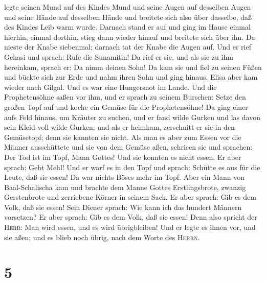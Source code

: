 legte seinen Mund auf des Kindes Mund und seine Augen auf desselben
Augen und seine Hände auf desselben Hände und breitete sich also über
dasselbe, daß des Kindes Leib warm wurde.  Darnach stand
er auf und ging im Hause einmal hierhin, einmal dorthin, stieg dann
wieder hinauf und breitete sich über ihn. Da nieste der Knabe siebenmal;
darnach tat der Knabe die Augen auf.  Und er rief Gehasi
und sprach: Rufe die Sunamitin! Da rief er sie, und als sie zu ihm
hereinkam, sprach er: Da nimm deinen Sohn!  Da kam sie
und fiel zu seinen Füßen und bückte sich zur Erde und nahm ihren Sohn
und ging hinaus.  Elisa aber kam wieder nach Gilgal. Und
es war eine Hungersnot im Lande. Und die Prophetensöhne saßen vor ihm,
und er sprach zu seinem Burschen: Setze den großen Topf auf und koche
ein Gemüse für die Prophetensöhne!  Da ging einer aufs
Feld hinaus, um Kräuter zu suchen, und er fand wilde Gurken und las
davon sein Kleid voll wilde Gurken; und als er heimkam, zerschnitt er
sie in den Gemüsetopf; denn sie kannten sie nicht.  Als
man es aber zum Essen vor die Männer ausschüttete und sie von dem Gemüse
aßen, schrieen sie und sprachen: Der Tod ist im Topf, Mann Gottes! Und
sie konnten es nicht essen.  Er aber sprach: Gebt Mehl!
Und er warf es in den Topf und sprach: Schütte es aus für die Leute, daß
sie essen! Da war nichts Böses mehr im Topf.  Aber ein
Mann von Baal-Schalischa kam und brachte dem Manne Gottes
Erstlingsbrote, zwanzig Gerstenbrote und zerriebene Körner in seinem
Sack. Er aber sprach: Gib es dem Volk, daß sie essen! 
Sein Diener sprach: Wie kann ich das hundert Männern vorsetzen? Er aber
sprach: Gib es dem Volk, daß sie essen! Denn also spricht der
\textsc{Herr}: Man wird essen, und es wird übrigbleiben! 
Und er legte es ihnen vor, und sie aßen; und es blieb noch übrig, nach
dem Worte des \textsc{Herrn}.

\hypertarget{section-4}{%
\section{5}\label{section-4}}

